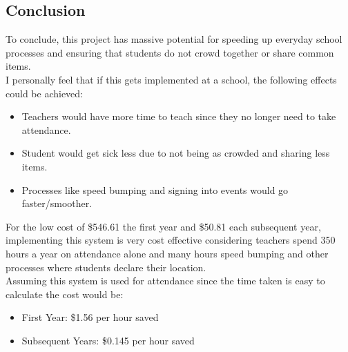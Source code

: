 \documentclass[12pt]{article}
\begin{document}
\begin{spacing}{1.2}
\section{Conclusion} \label{conclusion}
To conclude, this project has massive potential for speeding up everyday school processes and ensuring that students do not crowd together or share common items. \\ I personally feel that if this gets implemented at a school, the following effects could be achieved:
\begin{itemize}
	\item Teachers would have more time to teach since they no longer need to take attendance.
	\item Student would get sick less due to not being as crowded and sharing less items.
	\item Processes like speed bumping and signing into events would go faster/smoother. 
\end{itemize}
For the low cost of \$546.61 the first year and \$50.81 each subsequent year, implementing this system is very cost effective considering teachers spend 350 hours a year on attendance alone and many hours speed bumping and other processes where students declare their location. \\

Assuming this system is used for attendance since the time taken is easy to calculate the cost would be: \\
\begin{itemize}
	\item First Year: \$1.56 per hour saved
	\item Subsequent Years: \$0.145 per hour saved
\end{itemize}
\end{spacing}
\end{document}
